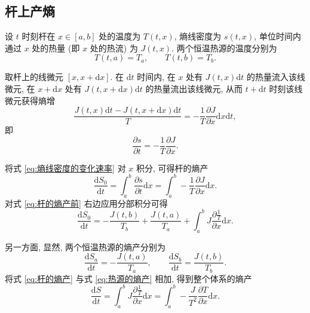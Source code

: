 \documentclass{article}
\begin{document}
\subsection{杆上产熵}
设 $t$ 时刻杆在 $x\in\left[a,b\right]$ 处的温度为 $T\!\left(t,x\right)$,
熵线密度为 $s\!\left(t,x\right)$,
单位时间内通过 $x$ 处的热量 (即 $x$ 处的热流) 为 $J\!\left(t,x\right)$.
两个恒温热源的温度分别为
\begin{equation}
T\!\left(t,a\right)=T_a,\qquad T\!\left(t,b\right)=T_b.
\label{eq:变分边界条件}
\end{equation}

取杆上的线微元 $\left[x,x+\mathrm dx\right]$.
在 $\mathrm dt$ 时间内, 在 $x$ 处有 $J\left(t,x\right)\mathrm dt$ 的热量流入该线微元,
在 $x+\mathrm dx$ 处有 $J\left(t,x+\mathrm dx\right)\mathrm dt$ 的热量流出该线微元,
从而 $t+\mathrm dt$ 时刻该线微元获得熵增
\begin{equation}
\frac{J\!\left(t,x\right)\mathrm dt-J\!\left(t,x+\mathrm dx\right)\mathrm dt}{T}=-\frac1T\frac{\partial J}{\partial x}\mathrm dx\mathrm dt,
\end{equation}
即
\begin{equation}
\frac{\partial s}{\partial t}=-\frac1T\frac{\partial J}{\partial x}.
\label{eq:熵线密度的变化速率}
\end{equation}

将式 \ref{eq:熵线密度的变化速率} 对 $x$ 积分, 可得杆的熵产
\begin{equation}
\frac{\mathrm dS_0}{\mathrm dt}=\int_a^b\frac{\partial s}{\partial t}\mathrm dx=\int_a^b-\frac1T\frac{\partial J}{\partial x}\mathrm dx.
\label{eq:杆的熵产前}
\end{equation}
对式 \ref{eq:杆的熵产前} 右边应用分部积分可得
\begin{equation}
\frac{\mathrm dS_0}{\mathrm dt}=-\frac{J\!\left(t,b\right)}{T_b}+\frac{J\!\left(t,a\right)}{T_a}+\int_a^bJ\frac{\partial\frac1T}{\partial x}\mathrm dx.
\label{eq:杆的熵产}
\end{equation}

另一方面, 显然, 两个恒温热源的熵产分别为
\begin{equation}
\frac{\mathrm dS_a}{\mathrm dt}=-\frac{J\!\left(t,a\right)}{T_a},\qquad
\frac{\mathrm dS_b}{\mathrm dt}=\frac{J\!\left(t,b\right)}{T_b}.
\label{eq:热源的熵产}
\end{equation}
将式 \ref{eq:杆的熵产} 与式 \ref{eq:热源的熵产} 相加, 得到整个体系的熵产
\begin{equation}
\frac{\mathrm dS}{\mathrm dt}=\int_a^bJ\frac{\partial\frac1T}{\partial x}\mathrm dx=\int_a^b-\frac{J}{T^2}\frac{\partial T}{\partial x}\mathrm dx.
\label{eq:整个体系的熵产}
\end{equation}
\end{document}
